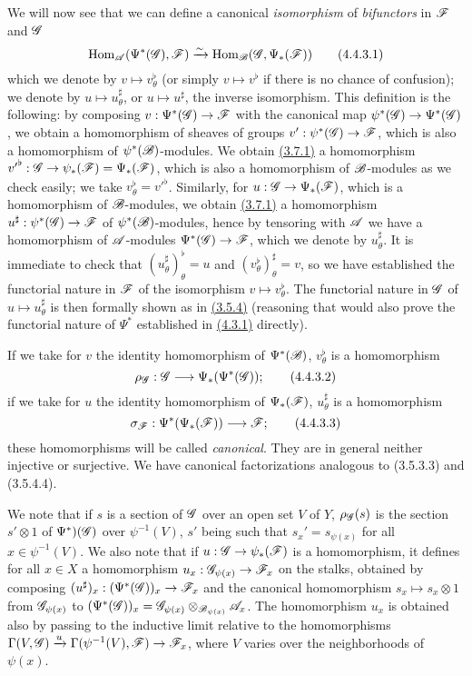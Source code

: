 \begin{env}[4.4.3]
\label{env-0.4.4.3}
We will now see that we can define a canonical {\em isomorphism} of {\em bifunctors} in
$\mathscr{F}$ and $\mathscr{G}$
\[
  {\mathop{\mathrm{Hom}}\nolimits}_\mathscr{A}(\Psi^*(\mathscr{G}),\mathscr{F})\xrightarrow{\sim}{\mathop{\mathrm{Hom}}\nolimits}_\mathscr{B}(\mathscr{G},\Psi_*(\mathscr{F}))
  \tag{4.4.3.1}
\]
which we denote by $v\mapsto v_\theta^\flat$ (or simply $v\mapsto v^\flat$ if there is no
chance of confusion); we denote by $u\mapsto u_\theta^\sharp$, or $u\mapsto u^\sharp$, the
inverse isomorphism. This definition is the following: by composing
$v:\Psi^*(\mathscr{G})\to\mathscr{F}$ with the canonical map $\psi^*(\mathscr{G})\to\Psi^*(\mathscr{G})$, we
obtain a homomorphism of sheaves of groups $v':\psi^*(\mathscr{G})\to\mathscr{F}$, which is also a
homomorphism of $\psi^*(\mathscr{B})$-modules. We obtain \hyperref[env-0.3.7.1]{(3.7.1)} a homomorphism
${v'}^\flat:\mathscr{G}\to\psi_*(\mathscr{F})=\Psi_*(\mathscr{F})$, which is also a homomorphism of
$\mathscr{B}$-modules as we
check easily; we take $v_\theta^\flat={v'}^\flat$. Similarly, for
$u:\mathscr{G}\to\Psi_*(\mathscr{F})$, which is a homomorphism of $\mathscr{B}$-modules, we obtain
\hyperref[env-0.3.7.1]{(3.7.1)} a homomorphism $u^\sharp:\psi^*(\mathscr{G})\to\mathscr{F}$ of
$\psi^*(\mathscr{B})$-modules, hence by tensoring with $\mathscr{A}$ we have a homomorphism of
$\mathscr{A}$-modules $\Psi^*(\mathscr{G})\to\mathscr{F}$, which we denote by $u_\theta^\sharp$. It is
immediate to check that $(u_\theta^\sharp)_\theta^\flat=u$ and
$(v_\theta^\flat)_\theta^\sharp=v$, so we have established the functorial nature in $\mathscr{F}$
of the isomorphism $v\mapsto v_\theta^\flat$. The functorial nature in $\mathscr{G}$ of
$u\mapsto u_\theta^\sharp$ is then formally shown as in \hyperref[env-0.3.5.4]{(3.5.4)} (reasoning that
would also prove the functorial nature of $\Psi^*$ established in \hyperref[env-0.4.3.1]{(4.3.1)}
directly).

If we take for $v$ the identity homomorphism of $\Psi^*(\mathscr{B})$, $v_\theta^\flat$ is a
homomorphism
\[
  \rho_\mathscr{G}:\mathscr{G}\longrightarrow\Psi_*(\Psi^*(\mathscr{G}));
  \tag{4.4.3.2}
\]
if we take for $u$ the identity homomorphism of $\Psi_*(\mathscr{F})$, $u_\theta^\sharp$ is a
homomorphism
\[
  \sigma_\mathscr{F}:\Psi^*(\Psi_*(\mathscr{F}))\longrightarrow\mathscr{F};
  \tag{4.4.3.3}
\]
these homomorphisms will be called {\em canonical}. They are in general neither injective or
surjective. We have canonical factorizations analogous to (3.5.3.3) and (3.5.4.4).

We note that if $s$ is a section of $\mathscr{G}$ over an open set $V$ of $Y$, $\rho_\mathscr{G}(s)$ is
the section $s'\otimes 1$ of $\Psi^*)(\mathscr{G})$ over $\psi^{-1}(V)$, $s'$ being such that
$s_x'=s_{\psi(x)}$ for all $x\in\psi^{-1}(V)$. We also note that if
$u:\mathscr{G}\to\psi_*(\mathscr{F})$ is a homomorphism, it defines for all $x\in X$ a homomorphism
$u_x:\mathscr{G}_{\psi(x)}\to\mathscr{F}_x$ on the stalks, obtained by composing
$(u^\sharp)_x:(\Psi^*(\mathscr{G}))_x\to\mathscr{F}_x$ and the canonical homomorphism
$s_x\mapsto s_x\otimes 1$ from $\mathscr{G}_{\psi(x)}$ to
$(\Psi^*(\mathscr{G}))_x=\mathscr{G}_{\psi(x)}\otimes_{\mathscr{B}_{\psi(x)}}\mathscr{A}_x$. The homomorphism
$u_x$ is obtained also by passing to the inductive limit relative to the homomorphisms
$\Gamma(V,\mathscr{G})\xrightarrow{u}\Gamma(\psi^{-1}(V),\mathscr{F})\to\mathscr{F}_x$, where $V$ varies
over the neighborhoods of $\psi(x)$.
\end{env}


